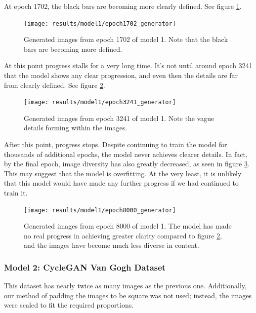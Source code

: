 \documentclass[11pt,letterpaper]{article}
\begin{document}
				At epoch 1702, the black bars are becoming more clearly defined.
				See figure \ref{fig:vgm:epoch1702generator}.
				\begin{figure}
					\centering
					\texttt{[image: results/model1/epoch1702\_generator]}
					\caption[Van Gogh Museum dataset, epoch 1702]{Generated images from epoch 1702 of model 1. Note that the black bars are becoming more defined.}
					\label{fig:vgm:epoch1702generator}
				\end{figure}

				At this point progress stalls for a very long time.
				It's not until around epoch 3241 that the model shows any clear progression, and even then the details are far from clearly defined.
				See figure \ref{fig:vgm:epoch3241generator}.
				\begin{figure}
					\centering
					\texttt{[image: results/model1/epoch3241\_generator]}
					\caption[Van Gogh Museum dataset, epoch 3241]{Generated images from epoch 3241 of model 1. Note the vague details forming within the images.}
					\label{fig:vgm:epoch3241generator}
				\end{figure}

				After this point, progress stops.
				Despite continuing to train the model for thousands of additional epochs, the model never achieves clearer details.
				In fact, by the final epoch, image diversity has also greatly decreased, as seen in figure \ref{fig:vgm:epoch8000generator}.
				This may suggest that the model is overfitting.
				At the very least, it is unlikely that this model would have made any further progress if we had continued to train it.
				\begin{figure}
					\centering
					\texttt{[image: results/model1/epoch8000\_generator]}
					\caption[Van Gogh Museum dataset, epoch 8000]{Generated images from epoch 8000 of model 1. The model has made no real progress in achieving greater clarity compared to figure \ref{fig:vgm:epoch3241generator}, and the images have become much less diverse in content.}
					\label{fig:vgm:epoch8000generator}
				\end{figure}
			\subsubsection{Model 2: CycleGAN Van Gogh Dataset}
				This dataset has nearly twice as many images as the previous one.
				Additionally, our method of padding the images to be square was not used; instead, the images were scaled to fit the required proportions.
\end{document}
